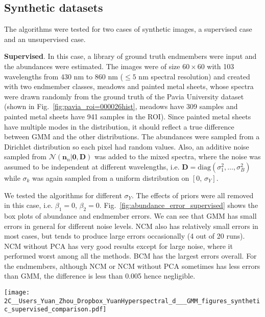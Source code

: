\documentclass[twocolumn,english]{IEEEtran}
\theoremstyle{plain}
\begin{document}
\subsection{Synthetic datasets}

The algorithms were tested for two cases of synthetic images, a supervised
case and an unsupervised case.

\textbf{Supervised}. In this case, a library of ground truth endmembers
were input and the abundances were estimated. The images were of size
$60\times60$ with 103 wavelengths from 430 nm to 860 nm ($\le5$
nm spectral resolution) and created with two endmember classes, meadows
and painted metal sheets, whose spectra were drawn randomly from the
ground truth of the Pavia University dataset (shown in Fig.~\ref{fig:pavia_roi=000026hist},
meadows have 309 samples and painted metal sheets have 941 samples
in the ROI). Since painted metal sheets have multiple modes in the
distribution, it should reflect a true difference between GMM and
the other distributions. The abundances were sampled from a Dirichlet
distribution so each pixel had random values. Also, an additive noise
sampled from $\mathcal{N}\left(\mathbf{n}_{n}|\mathbf{0},\mathbf{D}\right)$
was added to the mixed spectra, where the noise was assumed to be
independent at different wavelengths, i.e. $\mathbf{D}=\text{diag}\left(\sigma_{1}^{2},\dots,\sigma_{B}^{2}\right)$
while $\sigma_{k}$ was again sampled from a uniform distribution
on $\left[0,\,\sigma_{Y}\right]$. 

We tested the algorithms for different $\sigma_{Y}$. The effects
of priors were all removed in this case, i.e. $\beta_{1}=0$, $\beta_{2}=0$.
Fig.~\ref{fig:abundance_error_supervised} shows the box plots of
abundance and endmember errors. We can see that GMM has small errors
in general for different noise levels. NCM also has relatively small
errors in most cases, but tends to produce large errors occasionally
(4 out of 20 runs). NCM without PCA has very good results except for
large noise, where it performed worst among all the methods. BCM has
the largest errors overall. For the endmembers, although NCM or NCM
without PCA sometimes has less errors than GMM, the difference is
less than 0.005 hence negligible.

\begin{figure*}
\begin{centering}
\texttt{[image: 2C\_\_Users\_Yuan\_Zhou\_Dropbox\_YuanHyperspectral\_d\_\_\_GMM\_figures\_synthetic\_supervised\_comparison.pdf]}
\par\end{centering}
\caption{Abundance and endmember error statistics from 20 synthetic images
for each noise level in the supervised unmixing scenario.}

\label{fig:abundance_error_supervised}
\end{figure*}
\end{document}

